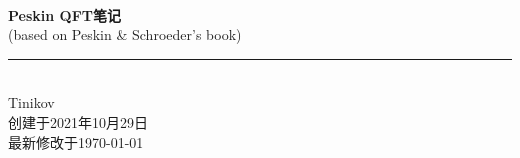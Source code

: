 \documentclass[10pt,b5paper, openany]{book} %
\newcommand{\HRule}{\rule{\linewidth}{0.5mm}}
\begin{document}
\pagestyle{fancy}

\begin{titlepage}
  \centering

  \mbox{} \\[-0.3cm]

  {\bfseries \fontsize{32pt}{1pt}\selectfont {}Peskin QFT笔记} \\[0.2cm]

  {\large (based on Peskin \& Schroeder's book)} \\[0.8cm]

  \HRule \\[0.8cm]

  {\Large Tinikov} \\[0.3cm]

  {\small 创建于2021年10月29日} \\[-0.1cm]

  {\small 最新修改于\today} \\[0.4cm]

\end{titlepage}

\setcounter{page}{1}

\clearpage

{}
\tableofcontents
\clearpage
\end{document}
